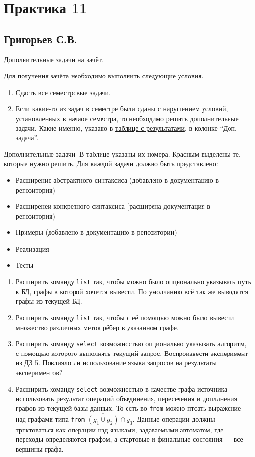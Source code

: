 \section{Практика 11}

\subsection{Григорьев С.В.}


Дополнительные задачи на зачёт.

Для получения зачёта необходимо выполнить следующие условия.

\begin{enumerate}
\item Сдасть все семестровые задачи.
\item Если какие-то из задач в семестре были сданы с нарушением условий, установленных в начаое семестра, то необходимо решить дополнительные задачи. Какие именно, указано в \href{https://docs.google.com/spreadsheets/d/1g1ZVACS0ATW7pVpvSI6L4mLKsxyuJEVh_HX6xhQRdmI/edit#gid=0}{таблице с результатами}, в колонке ``Доп. задача''.
\end{enumerate}

Дополнительные задачи. В таблице указаны их номера. Красным выделены те, которые нужно решить.
Для каждой задачи должно быть представлено:
\begin{itemize}
	\item Расширение абстрактного синтаксиса (добавлено в документацию в репозитории)
	\item Расширенеи конкретного синтаксиса (расширена документация в репозитории)
	\item Примеры (добавлено в документацию в репозитории)
	\item Реализация
	\item Тесты
\end{itemize}
\begin{enumerate}
  \item Расширить команду \verb|list| так, чтобы можно было опционально указывать путь к БД, графы в которой хочется вывести. По умолчанию всё так же выводятся графы из текущей БД.
  \item Расширить команду \verb|list| так, чтобы с её помощью можно было вывести множество различных меток рёбер в указанном графе.

  \item Расширить команду \verb|select| возможностью опционально указывать алгоритм, с помощью которого выполнять текущий запрос. Воспроизвести эксперимент из ДЗ 5. Повлияло ли использование языка запросов на результаты экспериментов?

  \item Расширить команду \verb|select| возможностью в качестве графа-источника использовать результат операций объединения, пересечения и допллнения графов из текущей базы данных. То есть во \verb|from| можно птсать выражение над графами типа \verb|from| $\overline{(g_1 \cup g_2)} \cap g_3$. Данные операции должны трпктоваться как операции над языками, задаваемыми автоматом, где переходы определяются графом, а стартовые и финальные состояния --- все вершины графа.
      

\end{enumerate}